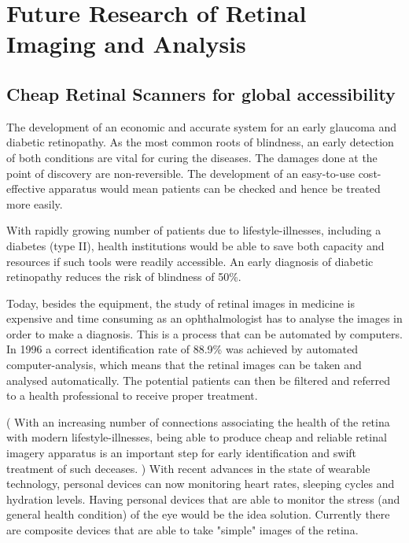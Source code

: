 
\chapter{Future Research of Retinal Imaging and Analysis}

\label{future_research}


\section{Cheap Retinal Scanners for global accessibility}

The development of an economic and accurate system for an early
glaucoma and diabetic retinopathy. As the most common roots of
blindness, an early detection of both conditions are vital for
curing the diseases. The damages done at the point of discovery
are non-reversible. The development of an easy-to-use cost-effective
apparatus would mean patients can be checked and hence be treated
more easily.

With rapidly growing number of patients due to lifestyle-illnesses,
including a diabetes (type II), health institutions would be able
to save both capacity and resources if such tools were readily
accessible. An early diagnosis of diabetic retinopathy reduces
the risk of blindness of 50\%.\cite{}

Today, besides the equipment, the study of retinal images in medicine
is expensive and time consuming as an ophthalmologist has to analyse
the images in order to make a diagnosis. This is a process that can
be automated by computers.  In 1996 a correct identification rate of
88.9\%
was achieved by automated computer-analysis, which means that the
retinal images can be taken and analysed automatically. The potential
patients can then be filtered and referred to a health professional
to receive proper treatment.\cite{}

( With an increasing number of connections associating the health
of the retina with modern lifestyle-illnesses, being able to produce
cheap and reliable retinal imagery apparatus is an important step for
early identification and swift treatment of such deceases. ) With
recent advances in the state of wearable technology, personal devices
can now monitoring heart rates, sleeping cycles and hydration levels.
Having personal devices that are able to monitor the stress (and
general health condition) of the eye would be the idea solution.
Currently there are composite devices that are able to take "simple"
images of the retina\cite{}.
 
